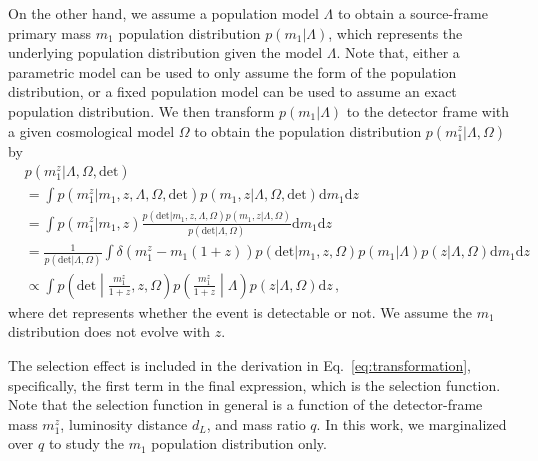 \documentclass[sn-aps, pdflatex]{sn-jnl}
\begin{document}
On the other hand, we assume a population model $\Lambda$ to obtain a source-frame primary mass $m_1$ population distribution $p(m_1|\Lambda)$, which represents the underlying population distribution given the model $\Lambda$.
Note that, either a parametric model can be used to only assume the form of the population distribution, or a fixed population model can be used to assume an exact population distribution.
We then transform $p(m_1|\Lambda)$ to the detector frame with a given cosmological model $\Omega$ to obtain the population distribution $p(m^z_1|\Lambda, \Omega)$ by
\begin{equation}
    \begin{aligned}
        &p(m^z_1|\Lambda, \Omega, \mathrm{det}) \\
        &= \int p(m^z_1|m_1, z, \Lambda, \Omega, \mathrm{det}) p(m_1, z|\Lambda, \Omega, \mathrm{det}) \mathrm{d}m_1 \mathrm{d}z \\
        &= \int p(m^z_1|m_1, z) \frac{p(\mathrm{det}|m_1, z, \Lambda, \Omega)p(m_1, z|\Lambda, \Omega)}{p(\mathrm{det}|\Lambda, \Omega)} \mathrm{d}m_1 \mathrm{d}z \\
        &= \frac{1}{p(\mathrm{det}|\Lambda, \Omega)}\int \delta(m^z_1-m_1(1+z))p(\mathrm{det}|m_1, z, \Omega)p(m_1|\Lambda)p(z|\Lambda, \Omega) \mathrm{d}m_1 \mathrm{d}z \\
        &\propto \int p\left(\mathrm{det}\middle|\frac{m^z_1}{1+z},z,\Omega\right)p\left(\frac{m^z_1}{1+z}\middle|\Lambda\right)p(z|\Lambda, \Omega) \mathrm{d}z\,,
    \end{aligned}
    \label{eq:transformation}
\end{equation}
where $\mathrm{det}$ represents whether the event is detectable or not.
We assume the $m_1$ distribution does not evolve with $z$.

The selection effect is included in the derivation in Eq.~\eqref{eq:transformation}, specifically, the first term in the final expression, which is the selection function.
Note that the selection function in general is a function of the detector-frame mass $m^z_1$, luminosity distance $d_L$, and mass ratio $q$.
In this work, we marginalized over $q$ to study the $m_1$ population distribution only.
\end{document}
